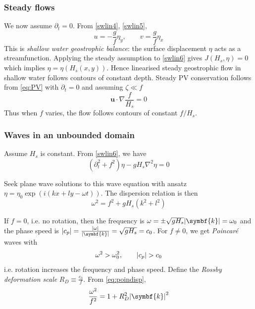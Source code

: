 \documentclass{jknotes}
\begin{document}
\subsubsection{Steady flows}
We now assume $\partial_t = 0$. From \eqref{swlin4}, \eqref{swlin5},
\begin{equation}
	u = -\frac{g}{f}\eta_y, \hspace{2em} v = \frac{g}{f}\eta_x
\end{equation}
This is \emph{shallow water geostrophic balance}: the surface displacement
$\eta$ acts as a streamfunction. Applying the steady assumption to
\eqref{swlin6} gives $J(H_s, \eta) = 0$ which implies $\eta = \eta(H_s(x,y))$.
Hence linearised steady geostrophic flow in shallow water follows contours of
constant depth.  Steady PV conservation follows from \eqref{eq:PV} with
$\partial_t = 0$ and assuming $\zeta \ll f$
\begin{equation}
	\symbf{u} \cdot \nabla \frac{f}{H_s} = 0
\end{equation}
Thus when $f$ varies, the flow follows contours of constant $f/H_s$.

\subsubsection{Waves in an unbounded domain}
Assume $H_s$ is constant. From \eqref{swlin6}, we have
\begin{equation}
	\left( \partial_t^2 + f^2\right)\eta - gH_s \nabla^2 \eta = 0
\end{equation}

Seek plane wave solutions to this wave equation with ansatz $\eta = \eta_0
\exp(i(kx+ly-\omega t))$. The dispersion relation is then
\begin{equation}
	\omega^2 = f^2 + gH_s (k^2 + l^2) \label{eq:poindisp}
\end{equation}

If $f = 0$, i.e. no rotation, then the frequency is $\omega = \pm \sqrt{gH_s}
\abs{\symbf{k}} = \omega_0$ and the phase speed is $\abs{c_p} =
\frac{\abs{\omega}}{\abs{\symbf{k}}} = \sqrt{gH_s} = c_0$. For $f \ne 0$, we get
\emph{Poincar\'{e}} waves with
\begin{equation}
	\omega^2 > \omega_0^2, \hspace{2em} \abs{c_p} > c_0
\end{equation}
i.e. rotation increases the frequency and phase speed. Define the \emph{Rossby
deformation scale} $R_D \equiv \frac{c_0}{f}$. From \eqref{eq:poindisp},
\begin{equation}
	\frac{\omega^2}{f^2} = 1 + R^2_D \abs{\symbf{k}}^2
\end{equation}
\end{document}
